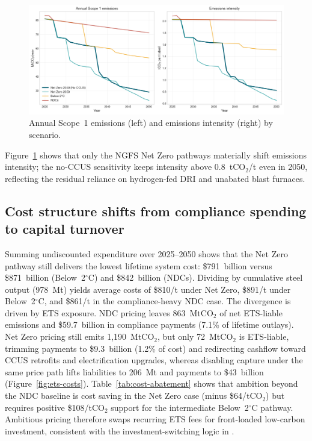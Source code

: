 \documentclass[preprint,1p,authoryear]{elsarticle}
\begin{document}
\begin{figure}[!t]
  \centering
  \includegraphics[width=0.85\linewidth]{emissions_pathways}
  \caption{Annual Scope~1 emissions (left) and emissions intensity (right) by scenario.}
  \label{fig:emissions-pathways}
\end{figure}

Figure~\ref{fig:emissions-pathways} shows that only the NGFS Net Zero pathways materially shift emissions intensity; the no-CCUS sensitivity keeps intensity above 0.8~tCO$_2$/t even in 2050, reflecting the residual reliance on hydrogen-fed DRI and unabated blast furnaces.

\subsection{Cost structure shifts from compliance spending to capital turnover}

Summing undiscounted expenditure over 2025--2050 shows that the Net Zero pathway still delivers the lowest lifetime system cost: \$791~billion versus \$871~billion (Below~2$^\circ$C) and \$842~billion (NDCs). Dividing by cumulative steel output (978~Mt) yields average costs of \$810/t under Net Zero, \$891/t under Below~2$^\circ$C, and \$861/t in the compliance-heavy NDC case. The divergence is driven by ETS exposure. NDC pricing leaves 863~MtCO$_2$ of net ETS-liable emissions and \$59.7~billion in compliance payments (7.1\% of lifetime outlays). Net Zero pricing still emits 1,190~MtCO$_2$, but only 72~MtCO$_2$ is ETS-liable, trimming payments to \$9.3~billion (1.2\% of cost) and redirecting cashflow toward CCUS retrofits and electrification upgrades, whereas disabling capture under the same price path lifts liabilities to 206~Mt and payments to \$43~billion (Figure~\ref{fig:ets-costs}). Table~\ref{tab:cost-abatement} shows that ambition beyond the NDC baseline is cost saving in the Net Zero case (minus \$64/tCO$_2$) but requires positive \$108/tCO$_2$ support for the intermediate Below~2$^\circ$C pathway. Ambitious pricing therefore swaps recurring ETS fees for front-loaded low-carbon investment, consistent with the investment-switching logic in \citet{fowlie2016carbon}.
\end{document}
